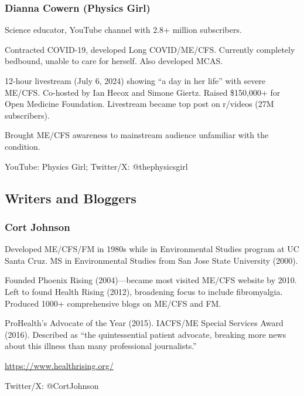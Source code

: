 \subsubsection{Dianna Cowern (Physics Girl)}
\begin{description}[style=sameline]
\item[Background] Science educator, YouTube channel with 2.8+ million subscribers.
\item[Illness] Contracted COVID-19, developed Long COVID/ME/CFS. Currently completely bedbound, unable to care for herself. Also developed MCAS.
\item[Advocacy] 12-hour livestream (July 6, 2024) showing ``a day in her life'' with severe ME/CFS. Co-hosted by Ian Hecox and Simone Giertz. Raised \$150,000+ for Open Medicine Foundation. Livestream became top post on r/videos (27M subscribers).
\item[Impact] Brought ME/CFS awareness to mainstream audience unfamiliar with the condition.
\item[Platform] YouTube: Physics Girl; Twitter/X: @thephysicsgirl
\end{description}

\subsection{Writers and Bloggers}

\subsubsection{Cort Johnson}
\begin{description}[style=sameline]
\item[Background] Developed ME/CFS/FM in 1980s while in Environmental Studies program at UC Santa Cruz. MS in Environmental Studies from San Jose State University (2000).
\item[Key work] Founded Phoenix Rising (2004)---became most visited ME/CFS website by 2010. Left to found Health Rising (2012), broadening focus to include fibromyalgia. Produced 1000+ comprehensive blogs on ME/CFS and FM.
\item[Recognition] ProHealth's Advocate of the Year (2015). IACFS/ME Special Services Award (2016). Described as ``the quintessential patient advocate, breaking more news about this illness than many professional journalists.''
\item[Website] \url{https://www.healthrising.org/}
\item[Social media] Twitter/X: @CortJohnson
\end{description}

